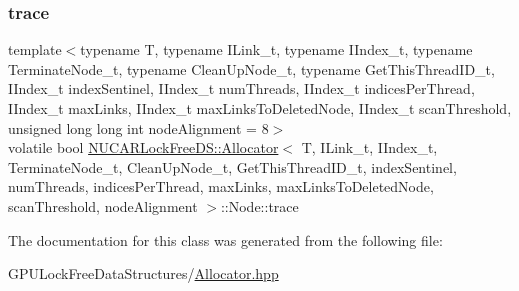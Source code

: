 \subsubsection{\texorpdfstring{trace}{trace}}
{\footnotesize\ttfamily template$<$typename T, typename I\+Link\+\_\+t, typename I\+Index\+\_\+t, typename Terminate\+Node\+\_\+t, typename Clean\+Up\+Node\+\_\+t, typename Get\+This\+Thread\+I\+D\+\_\+t, I\+Index\+\_\+t index\+Sentinel, I\+Index\+\_\+t num\+Threads, I\+Index\+\_\+t indices\+Per\+Thread, I\+Index\+\_\+t max\+Links, I\+Index\+\_\+t max\+Links\+To\+Deleted\+Node, I\+Index\+\_\+t scan\+Threshold, unsigned long long int node\+Alignment = 8$>$ \\
volatile bool \mbox{\hyperlink{class_n_u_c_a_r_lock_free_d_s_1_1_allocator}{N\+U\+C\+A\+R\+Lock\+Free\+D\+S\+::\+Allocator}}$<$ T, I\+Link\+\_\+t, I\+Index\+\_\+t, Terminate\+Node\+\_\+t, Clean\+Up\+Node\+\_\+t, Get\+This\+Thread\+I\+D\+\_\+t, index\+Sentinel, num\+Threads, indices\+Per\+Thread, max\+Links, max\+Links\+To\+Deleted\+Node, scan\+Threshold, node\+Alignment $>$\+::Node\+::trace\hspace{0.3cm}{\ttfamily [private]}}



The documentation for this class was generated from the following file\+:\begin{DoxyCompactItemize}
\item 
G\+P\+U\+Lock\+Free\+Data\+Structures/\mbox{\hyperlink{_allocator_8hpp}{Allocator.\+hpp}}\end{DoxyCompactItemize}
